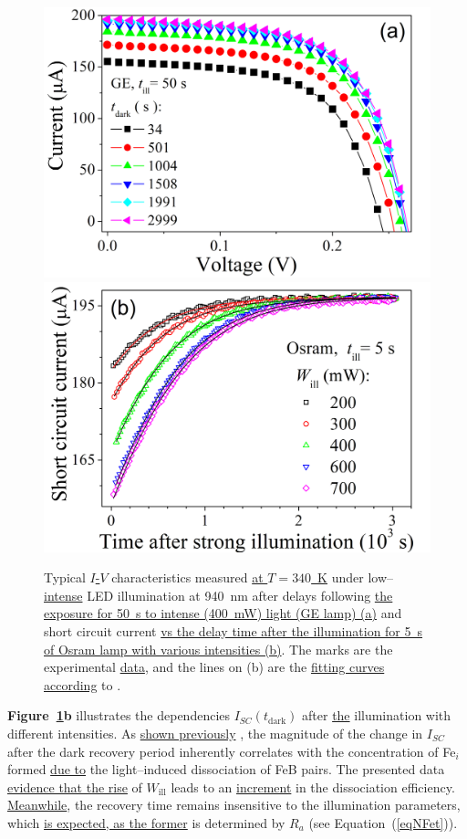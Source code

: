 \documentclass{WileyMSP-template}
\begin{document}
\begin{figure}
\centering
  \includegraphics[width=0.4\linewidth]{Fig2a.png}
  \includegraphics[width=0.4\linewidth]{Fig2b.png}
  \caption{Typical \textcolor[rgb]{0.00,0.07,1.00}{\uline{$I$-$V$}} characteristics measured \textcolor[rgb]{0.00,0.07,1.00}{\uline{at $T=340$~K}}
  under low--\textcolor[rgb]{0.00,0.07,1.00}{\uline{intense}} LED illumination at 940~nm after delays following
  \textcolor[rgb]{0.00,0.07,1.00}{\uline{the exposure for 50~s to intense (400~mW) light (GE lamp) (a)}} and
  short circuit current \textcolor[rgb]{0.00,0.07,1.00}{\uline{vs the delay time after the illumination for 5~s of Osram lamp with various intensities (b)}}.
  The marks are the experimental \textcolor[rgb]{0.00,0.07,1.00}{\uline{data}}, and the lines on (b) are the
  \textcolor[rgb]{0.00,0.07,1.00}{\uline{fitting curves according}} to \cite{Olikh2022:JMatSci,Olikh2021JAP}.
  }
  \label{fig2}
\end{figure}

\textbf{Figure~\ref{fig2}b} illustrates the dependencies $I_{SC}(t_\mathrm{dark})$ after \textcolor[rgb]{0.00,0.07,1.00}{\uline{the}} illumination with different intensities.
As \textcolor[rgb]{0.00,0.07,1.00}{\uline{shown previously}} \cite{Olikh2021JAP}, the magnitude of the change in $I_{SC}$ after the dark recovery period
inherently correlates with the concentration of Fe$_i$ formed \textcolor[rgb]{0.00,0.07,1.00}{\uline{due to}} the light--induced dissociation of FeB pairs.
The presented data \textcolor[rgb]{0.00,0.07,1.00}{\uline{evidence that the rise}} of $W_\mathrm{ill}$ leads to an \textcolor[rgb]{0.00,0.07,1.00}{\uline{increment}} in the dissociation efficiency.
\textcolor[rgb]{0.00,0.07,1.00}{\uline{Meanwhile}}, the recovery time remains insensitive to the illumination parameters, which
\textcolor[rgb]{0.00,0.07,1.00}{\uline{is expected, as the former}} is determined by $R_a$ (see Equation~(\ref{eqNFet})).
\end{document}

